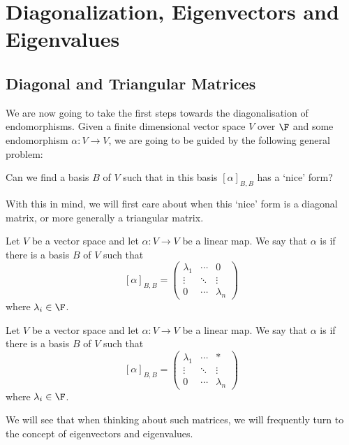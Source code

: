 \section{Diagonalization, Eigenvectors and Eigenvalues}


\subsection{Diagonal and Triangular Matrices}

We are now going to take the first steps towards the diagonalisation of endomorphisms. 
Given a finite dimensional vector space $V$ over $\F$ and some endomorphism $\alpha: V \rightarrow V$, we are going to be guided by the following general problem:
\begin{center}\color{blue}
    Can we find a basis $B$ of $V$ such that in this basis $[\alpha]_{B, B}$ has a `nice' form?
\end{center}
With this in mind, we will first care about when this `nice' form is a diagonal matrix, or more generally a triangular matrix.


\begin{definition}[Diagonalizable]
    Let $V$ be a vector space and let $\alpha: V \rightarrow V$ be a linear map. We say that $\alpha$ is  if there is a basis $B$ of $V$ such that
    $$
    [\alpha]_{B, B} = \begin{pmatrix}
        \lambda_1 & \cdots & 0 \\
        \vdots & \ddots & \vdots \\
        0 & \cdots & \lambda_n
    \end{pmatrix}
    $$
    where $\lambda_i \in \F$.
\end{definition}

\begin{definition}[Triangulable]    
    Let $V$ be a vector space and let $\alpha: V \rightarrow V$ be a linear map. We say that $\alpha$ is  if there is a basis $B$ of $V$ such that
    $$
    [\alpha]_{B, B} = \begin{pmatrix}
        \lambda_1 & \cdots & * \\
        \vdots & \ddots & \vdots \\
        0 & \cdots & \lambda_n
    \end{pmatrix}
    $$
    where $\lambda_i \in \F$. 
\end{definition}


We will see that when thinking about such matrices, we will frequently turn to the concept of eigenvectors and eigenvalues.

